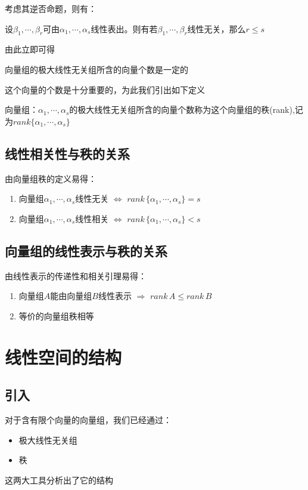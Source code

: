 考虑其逆否命题，则有：
\begin{corollary}
    设$\beta_1, \cdots, \beta_r$可由$\alpha_1, \cdots, \alpha_s$线性表出。则有若$\beta_1, \cdots, \beta_r$线性无关，那么$r \leq s$
\end{corollary}

由此立即可得
\begin{theorem}
    向量组的极大线性无关组所含的向量个数是一定的
\end{theorem}

这个向量的个数是十分重要的，为此我们引出如下定义
\begin{definition}
    向量组：$\alpha_1, \cdots, \alpha_s$的极大线性无关组所含的向量个数称为这个向量组的秩(rank),记为$rank\{\alpha_1, \cdots, \alpha_s\}$    
\end{definition}

\subsection*{线性相关性与秩的关系}
由向量组秩的定义易得：
\begin{enumerate}
    \item 向量组$\alpha_1, \cdots, \alpha_s$线性无关 $\Leftrightarrow$ $rank \, \{\alpha_1, \cdots, \alpha_s\} = s$
    \item 向量组$\alpha_1, \cdots, \alpha_s$线性相关 $\Leftrightarrow$ $rank \, \{\alpha_1, \cdots, \alpha_s\} < s$
\end{enumerate}

\subsection*{向量组的线性表示与秩的关系}
由线性表示的传递性和相关引理易得：
\begin{enumerate}
    \item 向量组$A$能由向量组$B$线性表示 $\Rightarrow$ $rank \, A \leq rank \, B$
    \item 等价的向量组秩相等
\end{enumerate}

\section{线性空间的结构}

\subsection*{引入}
对于含有限个向量的向量组，我们已经通过：
\begin{itemize}
    \item 极大线性无关组
    \item 秩
\end{itemize}
这两大工具分析出了它的结构

